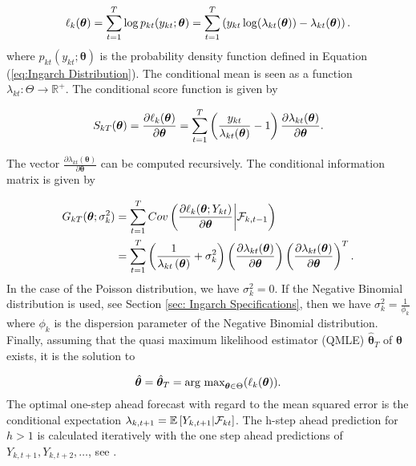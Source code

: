 \begin{equation}
\ell_k(\bm{\theta}) = \sum_{t=1}^T\log p_{kt}(y_{kt};\bm{\theta}) = \sum_{t=1}^T \left(y_{kt}\log(\lambda_{kt}(\bm{\theta})) - \lambda_{kt}(\bm{\theta})\right).
\label{eq: Quasi log likelihood}
\end{equation}
%
where $p_{kt}(y_{kt};\bm{\theta})$ is the probability density function defined in Equation (\ref{eq:Ingarch Distribution}). The conditional mean is seen as a function $\lambda_{kt}: \Theta \rightarrow \mathbb{R}^{+}$. The conditional score function is given by

\begin{equation}
S_{kT}(\bm{\theta}) = \frac{\partial \ell_k(\bm{\theta})}{\partial \bm{\theta}} = \sum_{t=1}^T\left(\frac{y_{kt}}{\lambda_{kt}(\bm{\theta})}-1\right)\frac{\partial\lambda_{kt}(\bm{\theta})}{\partial \bm{\theta}}.
\label{eq:conditional score}
\end{equation}

The vector $\frac{\partial\lambda_{kt}(\bm{\theta})}{\partial \bm{\theta}}$ can be computed recursively. 
The conditional information matrix is given by

\begin{equation}
\begin{aligned}
G_{kT}(\bm{\theta};\sigma_k^2) &= \sum_{t=1}^T Cov\left(\frac{\partial \ell_k(\bm{\theta}; Y_{kt})}{\partial \bm{\theta}} \middle| \mathcal{F}_{k,t-1}\right) \\
&=  \sum_{t=1}^T \left(\frac{1}{\lambda_{kt}\left(\bm{\theta}\right)}+\sigma_k^2\right) \left(\frac{\partial \lambda_{kt}(\bm{\theta})}{\partial \bm{\theta}}\right)\left(\frac{\partial \lambda_{kt}(\bm{\theta})}{\partial \bm{\theta}}\right)^T.
\label{eq:conditional information matrix}
\end{aligned}
\end{equation}
%
In the case of the Poisson distribution, we have $\sigma_k^2=0$. If the Negative Binomial distribution is used, see Section \ref{sec: Ingarch Specifications}, then we have $\sigma_k^2=\frac{1}{\phi_k}$ where $\phi_k$ is the dispersion parameter of the Negative Binomial distribution. 
Finally, assuming that the quasi maximum likelihood estimator (QMLE) $\hat{\bm{\theta}}_T$ of $\bm{\theta}$ exists, it is the solution to 

\begin{equation}
\hat{\bm{\theta}}= \hat{\bm{\theta}}_T = \text{arg max}_{\bm{\theta} \in \Theta} (\ell_k(\bm{\theta})). 
\label{eq:ingarch qmle}
\end{equation}
%
The optimal one-step ahead forecast with regard to the mean squared error is the conditional expectation $\lambda_{k,t+1}=\mathbb{E}\left[Y_{k,t+1} | \mathcal{F}_{kt} \right]$. The h-step ahead prediction for $h>1$ is calculated iteratively with the one step ahead predictions of $Y_{k,t+1},Y_{k,t+2},\ldots$, see \textcite{Liboschik:2016}. 

